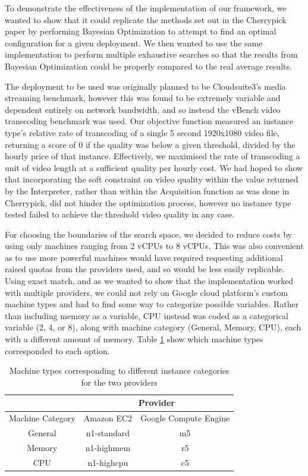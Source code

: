 \documentclass{article}
\begin{document}
To demonstrate the effectiveness of the implementation of our framework, we wanted to show that it could replicate the methods set out in the Cherrypick paper \cite{Alipourfard2017} by performing Bayesian Optimization to attempt to find an optimal configuration for a given deployment. We then wanted to use the same implementation to perform multiple exhaustive searches so that the results from Bayesian Optimization could be properly compared to the real average results. 

The deployment to be used was originally planned to be Cloudsuite3's media streaming benchmark, however this was found to be extremely variable and dependent entirely on network bandwidth, and so instead the vBench video transcoding benchmark was used. Our objective function measured an instance type's relative rate of transcoding of a single 5 second 1920x1080 video file, returning a score of 0 if the quality was below a given threshold, divided by the hourly price of that instance. Effectively, we maximised the rate of transcoding a unit of video length at a sufficient quality per hourly cost. We had hoped to show that incorporating the soft constraint on video quality within the value returned by the Interpreter, rather than within the Acquisition function as was done in Cherrypick, did not hinder the optimization process, however no instance type tested failed to achieve the threshold video quality in any case.

For choosing the boundaries of the search space, we decided to reduce costs by using only machines ranging from 2 vCPUs to 8 vCPUs. This was also convenient as to use more powerful machines would have required requesting additional raised quotas from the providers used, and so would be less easily replicable. Using exact match, and as we wanted to show that the implementation worked with multiple providers, we could not rely on Google cloud platform's custom machine types and had to find some way to categorize possible variables. Rather than including memory as a variable, CPU instead was coded as a categorical variable (2, 4, or 8), along with machine category (General, Memory, CPU), each with a different amount of memory. Table \ref{tab:instance-types} show which machine types corresponded to each option. 

\begin{table}
\begin{tabular}{ |c||c|c|  }
 \hline
 & \multicolumn{2}{|c|}{Provider} \\
 \hline
 Machine Category & Amazon EC2 & Google Compute Engine \\
 \hline
 General& n1-standard & m5\\
 Memory & n1-highmem  & r5\\
 CPU    & n1-highcpu  & c5\\
 \hline
\end{tabular}
\caption{Machine types corresponding to different instance categories for the two providers}
\label{tab:instance-types}
\end{table}
\end{document}
